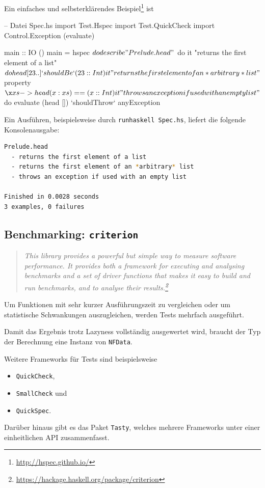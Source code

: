 Ein einfaches und selbsterklärendes
Beispiel\footnote{\url{http://hspec.github.io/}} ist
\begin{hcode}
-- Datei Spec.hs
import Test.Hspec
import Test.QuickCheck
import Control.Exception (evaluate)

main :: IO ()
main = hspec $ do
  describe "Prelude.head" $ do
    it "returns the first element of a list" $ do
      head [23 ..] `shouldBe` (23 :: Int)

    it "returns the first element of an *arbitrary* list" $
      property $ \x xs -> head (x:xs) == (x :: Int)

    it "throws an exception if used with an empty list" $ do
      evaluate (head []) `shouldThrow` anyException
\end{hcode}
Ein Ausführen, beispielsweise durch \texttt{runhaskell Spec.hs},
liefert die folgende Konsolenausgabe:
\begin{lstlisting}[language=bash 
                  ,numbers=none
                  ,backgroundcolor=\color{lightgray}]
Prelude.head
  - returns the first element of a list
  - returns the first element of an *arbitrary* list
  - throws an exception if used with an empty list

Finished in 0.0028 seconds
3 examples, 0 failures
\end{lstlisting}

\subsection{Benchmarking: \texttt{criterion}}
\begin{quote}\itshape
  This library provides a powerful but simple way to measure software
  performance. It provides both a framework for executing and analysing
  benchmarks and a set of driver functions that makes it easy to build and run
  benchmarks, and to analyse their
  results.\footnote{\url{https://hackage.haskell.org/package/criterion}}
\end{quote}
Um Funktionen mit sehr kurzer Ausführungszeit zu vergleichen oder um
statistische Schwankungen auszugleichen, werden Tests mehrfach ausgeführt.

Damit das Ergebnis trotz Lazyness vollständig ausgewertet wird, braucht der
Typ der Berechnung eine Instanz von \texttt{NFData}.

Weitere Frameworks für Tests sind beispielsweise
\begin{itemize}
  \item \texttt{QuickCheck},
  \item \texttt{SmallCheck} und
  \item \texttt{QuickSpec}.
\end{itemize}
Darüber hinaus gibt es das Paket \texttt{Tasty}, welches mehrere Frameworks 
unter einer einheitlichen API zusammenfasst.

